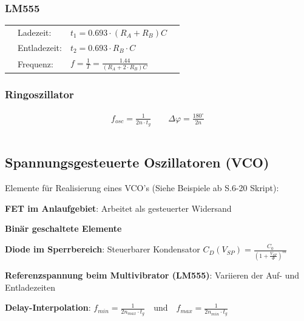 \begin{multicols}{2}
\subsubsection*{LM555}
	    \begin{tabular}{Llll}
           & Ladezeit:             & $t_1=0.693\cdot(R_A+R_B)C$    \\
           & Entladezeit:          & $t_2=0.693\cdot R_B \cdot C$   \\
           &  Frequenz:             & $f=\frac{1}{T}=\frac{1.44}{(R_A+2\cdot R_B)C}$    \\
    \end{tabular}
    \hfill \columnbreak
    
    \subsubsection*{Ringoszillator}
	\begin{equation*} 
        \begin{split} 
          f_{osc} =\frac{1}{2n\cdot t_g} \quad \quad \Delta\varphi =\frac{180^\circ}{2n}   \\\\
        \end{split} 
      \end{equation*}
\end{multicols}

\FloatBarrier
\subsection{Spannungsgesteuerte Oszillatoren (VCO) }
Elemente für Realisierung eines VCO's (Siehe Beispiele ab S.6-20 Skript):

\begin{compactitem}
   \item \textbf{FET im Anlaufgebiet}: Arbeitet als gesteuerter Widersand
   \item \textbf{Binär geschaltete Elemente}
   \item \textbf{Diode im Sperrbereich}: Steuerbarer Kondensator $C_D(V_{SP})=\frac{C_0}{(1+\frac{V_{SP}}{\Phi})^m}$
   \item \textbf{Referenzspannung beim Multivibrator (LM555)}: Variieren der Auf- und Entladezeiten
   \item \textbf{Delay-Interpolation}: $f_{min} =\frac{1}{2n_{max}\cdot t_g} \quad \text{und} \quad f_{max} =\frac{1}{2n_{min}\cdot t_g}$
\end{compactitem}



